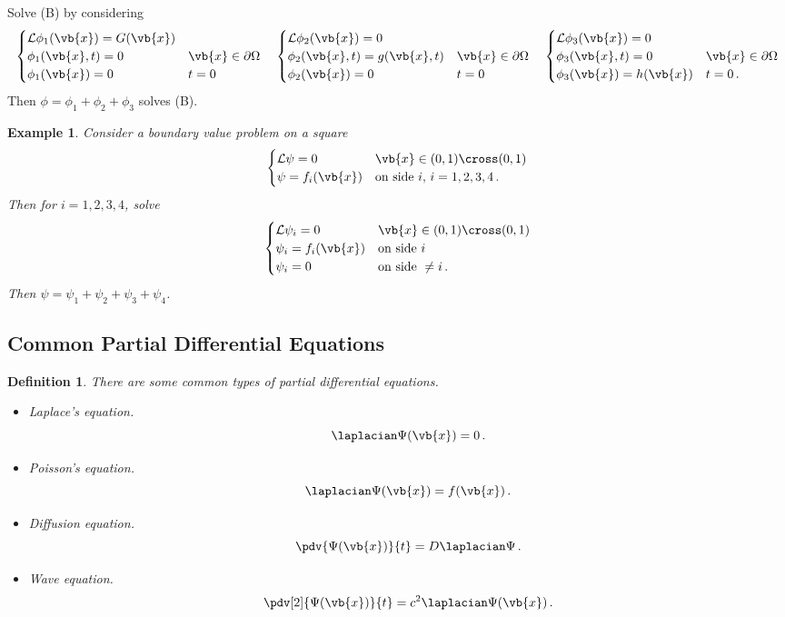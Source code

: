 \documentclass{article}
\theoremstyle{plain}\theoremheaderfont{\normalfont\itshape}\theorembodyfont{\rmfamily}\theoremseparator{.}\newtheorem*{rem}{Remark}\newtheorem*{ex}{Example}\newtheorem*{proof}{Proof}\newtheorem*{altp}{Alternative proof}
\theoremstyle{plain}\theoremheaderfont{\normalfont\bfseries}\theorembodyfont{\rmfamily}\theoremseparator{.}\newtheorem{thm}{Theorem}[section]\newtheorem{lem}[thm]{Lemma}\newtheorem{prop}[thm]{Proposition}\newtheorem*{cor}{Corollary}\newtheorem{defn}[thm]{Definition}\newtheorem{clm}[thm]{Claim}\newtheorem{clminproof}{Claim}
\theoremstyle{break}\theoremheaderfont{\normalfont\itshape}\theorembodyfont{\rmfamily}\theoremseparator{.\medskip}\newtheorem*{proofskip}{Proof}\newtheorem*{exs}{Examples}\newtheorem*{rems}{Remarks}
\theoremstyle{break}\theoremheaderfont{\normalfont\bfseries}\theorembodyfont{\rmfamily}\theoremseparator{.\medskip}\newtheorem{lemskip}[thm]{Lemma}\newtheorem{defnskip}[thm]{Definition}\newtheorem{propskip}[thm]{Proposition}\newtheorem{thmskip}[thm]{Theorem}
\numberwithin{equation}{section}
\begin{document}
	Solve (B) by considering
	\[\begin{cases}
		\mathcal{L}\phi_1(\vb{x})=G(\vb{x})\\
		\phi_1(\vb{x},t)=0 & \vb{x}\in\partial\Omega\\
		\phi_1(\vb{x})=0 & t=0
	\end{cases}\quad\begin{cases}
		\mathcal{L}\phi_2(\vb{x})=0\\
		\phi_2(\vb{x},t)=g(\vb{x},t) & \vb{x}\in\partial\Omega\\
		\phi_2(\vb{x})=0 & t=0
	\end{cases}\quad\begin{cases}
		\mathcal{L}\phi_3(\vb{x})=0\\
		\phi_3(\vb{x},t)=0 & \vb{x}\in\partial\Omega\\
		\phi_3(\vb{x})=h(\vb{x}) & t=0\,.
	\end{cases}\]
	Then \(\phi=\phi_1+\phi_2+\phi_3\) solves (B).
	\begin{ex}
		Consider a boundary value problem on a square
		\[\begin{cases}
			\mathcal{L}\psi=0 & \vb{x}\in (0,1)\cross(0,1)\\
			\psi = f_i(\vb{x}) & \text{on side } i,\,i=1,2,3,4\,.
		\end{cases}\]
		Then for \(i=1,2,3,4\), solve
		\[\begin{cases}
			\mathcal{L}\psi_i=0 & \vb{x}\in (0,1)\cross(0,1)\\
			\psi_i = f_i(\vb{x}) & \text{on side } i\\
			\psi_i = 0 & \text{on side }\ne i\,.
		\end{cases}\]
		Then \(\psi=\psi_1+\psi_2+\psi_3+\psi_4\).
	\end{ex}
	\subsection{Common Partial Differential Equations}
	\begin{defn}
		There are some common types of partial differential equations.
		\begin{itemize}[topsep=0pt]
			\item \textit{Laplace's equation.}
			\[\laplacian\Psi(\vb{x})=0\,.\]
			\item \textit{Poisson's equation.}
			\[\laplacian\Psi(\vb{x})=f(\vb{x})\,.\]
			\item \textit{Diffusion equation.}
			\[\pdv{\Psi(\vb{x})}{t}=D\laplacian\Psi\,.\]
			\item \textit{Wave equation.}
			\[\pdv[2]{\Psi(\vb{x})}{t}=c^2\laplacian\Psi(\vb{x})\,.\]
		\end{itemize}
	\end{defn}
	
\end{document}
